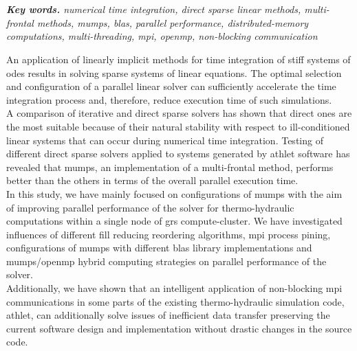 \chapter{\abstractname}

\textit{\textbf{Key words.} numerical time integration, direct sparse linear methods, multi-frontal methods, \acrshort{mumps}, \acrshort{blas}, parallel performance, distributed-memory computations,  multi-threading, \acrshort{mpi}, \acrshort{openmp}, non-blocking communication}

\vspace{10mm}



An application of linearly implicit methods for time integration of stiff systems of \acrshort{ode}s  results in solving sparse systems of linear equations. The optimal selection and configuration of a parallel linear solver can sufficiently accelerate the time integration process and, therefore, reduce execution time of such simulations.\\



A comparison of iterative and direct sparse solvers has shown that direct ones are the most suitable because of their natural stability with respect to ill-conditioned linear systems that can occur during numerical time integration. Testing of different direct sparse solvers applied to systems generated by \acrshort{athlet} software has revealed that \acrshort{mumps}, an implementation of a multi-frontal method, performs better than the others in terms of the overall parallel execution time.\\


In this study, we have mainly focused on configurations of \acrshort{mumps} with the aim of improving parallel performance of the solver for thermo-hydraulic computations within a single node of \acrshort{grs} compute-cluster. We have investigated influences of  different fill reducing reordering algorithms, \acrshort{mpi} process pining, configurations of \acrshort{mumps} with different \acrshort{blas} library implementations and \acrshort{mumps}/\acrshort{openmp} hybrid computing strategies on parallel performance of the solver.\\


Additionally, we have shown that an intelligent application of non-blocking \acrshort{mpi} communications in some parts of the existing thermo-hydraulic simulation code, \acrshort{athlet}, can additionally solve issues of inefficient data transfer preserving the current software design and implementation without drastic changes in the source code.\\